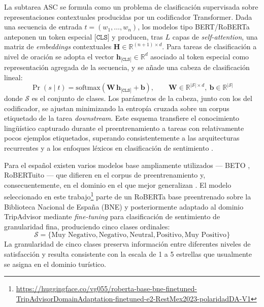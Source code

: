 La subtarea ASC se formula como un problema de clasificación supervisada sobre representaciones contextuales producidas por un codificador Transformer. Dada una secuencia de entrada $t = (w_1, \ldots, w_n)$, los modelos tipo BERT/RoBERTa anteponen un token especial $\texttt{[CLS]}$ y producen, tras $L$ capas de \textit{self-attention}, una matriz de \textit{embeddings} contextuales $\mathbf{H} \in \mathbb{R}^{(n+1) \times d}$. Para tareas de clasificación a nivel de oración se adopta el vector $\mathbf{h}_{\texttt{[CLS]}} \in \mathbb{R}^d$ asociado al token especial como representación agregada de la secuencia, y se añade una cabeza de clasificación lineal:
\begin{equation} \label{eq:cls_head}
	\Pr(s \mid t) = \mathrm{softmax}\!\left(\mathbf{W}\, \mathbf{h}_{\texttt{[CLS]}} + \mathbf{b}\right), \qquad \mathbf{W} \in \mathbb{R}^{|\mathcal{S}| \times d},\ \mathbf{b} \in \mathbb{R}^{|\mathcal{S}|}
\end{equation}
donde $\mathcal{S}$ es el conjunto de clases. Los parámetros de la cabeza, junto con los del codificador, se ajustan minimizando la entropía cruzada sobre un corpus etiquetado de la tarea \textit{downstream}. Este esquema transfiere el conocimiento lingüístico capturado durante el preentrenamiento a tareas con relativamente pocos ejemplos etiquetados, superando consistentemente a las arquitecturas recurrentes y a los enfoques léxicos en clasificación de sentimiento \citep{do_deep_2019}.

Para el español existen varios modelos base ampliamente utilizados --- BETO \citep{CaneteCFP2020}, RoBERTuito \citep{perez-etal-2022-robertuito} --- que difieren en el corpus de preentrenamiento y, consecuentemente, en el dominio en el que mejor generalizan \citep{do_deep_2019}. El modelo seleccionado en este trabajo\footnote{\url{https://huggingface.co/vg055/roberta-base-bne-finetuned-TripAdvisorDomainAdaptation-finetuned-e2-RestMex2023-polaridadDA-V1}} parte de un RoBERTa base \citep{DBLP:journals/corr/abs-1911-02116} preentrenado sobre la Biblioteca Nacional de España (BNE) y posteriormente adaptado al dominio TripAdvisor mediante \textit{fine-tuning} para clasificación de sentimiento de granularidad fina, produciendo cinco clases ordinales:
\begin{equation*}
	\mathcal{S} = \{\text{Muy Negativo}, \text{Negativo}, \text{Neutral}, \text{Positivo}, \text{Muy Positivo}\}
\end{equation*}
La granularidad de cinco clases preserva información entre diferentes niveles de satisfacción y resulta consistente con la escala de 1 a 5 estrellas que usualmente se asigna en el dominio turístico.

